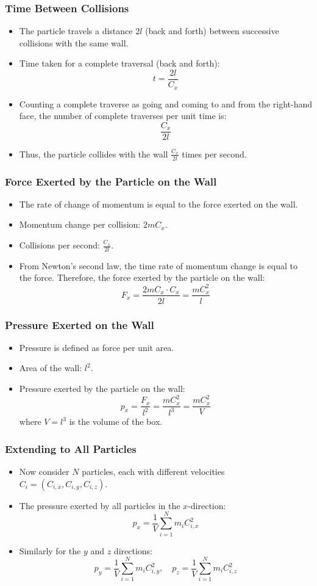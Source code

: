 \documentclass{beamer}
\begin{document}
\begin{frame}
\frametitle{Time Between Collisions}
\begin{itemize}
    \item The particle travels a distance $2l$ (back and forth) between successive collisions with the same wall.
    \item Time taken for a complete traversal (back and forth):
    \[
    t = \frac{2l}{C_x}
    \]
    \item Counting a complete traverse as going and coming to and from the right-hand face, the number of complete traverses per unit time is:
    \[
    \frac{C_x}{2l}
    \]
    \item Thus, the particle collides with the wall $\frac{C_x}{2l}$ times per second.
\end{itemize}
\end{frame}

\begin{frame}
\frametitle{Force Exerted by the Particle on the Wall}
\begin{itemize}
    \item The rate of change of momentum is equal to the force exerted on the wall.
    \item Momentum change per collision: $2mC_x$.
    \item Collisions per second: $\frac{C_x}{2l}$.
    \item  From Newton’s second law, the time rate of momentum change is equal to the force. Therefore, the force exerted by the particle on the wall:
    \[
    F_x = \frac{2mC_x \cdot C_x}{2l} = \frac{mC_x^2}{l}
    \]
\end{itemize}
\end{frame}

\begin{frame}
\frametitle{Pressure Exerted on the Wall}
\begin{itemize}
    \item Pressure is defined as force per unit area.
    \item Area of the wall: $l^2$.
    \item Pressure exerted by the particle on the wall:
    \[
    p_x = \frac{F_x}{l^2} = \frac{mC_x^2}{l^3} = \frac{mC_x^2}{V}
    \]
    where $V = l^3$ is the volume of the box.
\end{itemize}
\end{frame}

\begin{frame}
\frametitle{Extending to All Particles}
\begin{itemize}
    \item Now consider $N$ particles, each with different velocities $C_i = (C_{i,x}, C_{i,y}, C_{i,z})$.
    \item The pressure exerted by all particles in the $x$-direction:
    \[
    p_x = \frac{1}{V} \sum_{i=1}^{N} m_i C_{i,x}^2
    \]
    \item Similarly for the $y$ and $z$ directions:
    \[
    p_y = \frac{1}{V} \sum_{i=1}^{N} m_i C_{i,y}^2, \quad p_z = \frac{1}{V} \sum_{i=1}^{N} m_i C_{i,z}^2
    \]
\end{itemize}
\end{frame}
\end{document}
